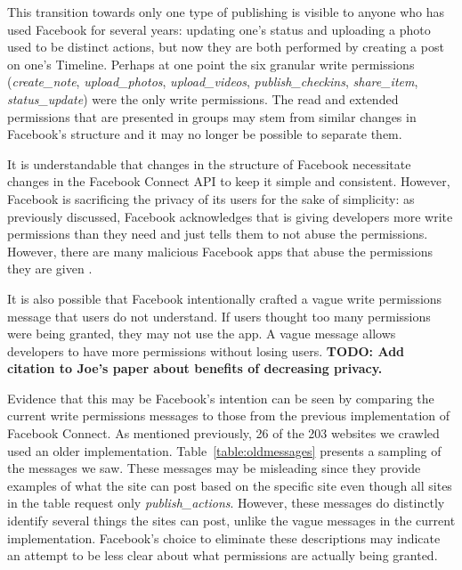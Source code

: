 \documentclass[10pt]{sig-alternate-10pt}
\begin{document}
This transition towards only one type of publishing is visible to anyone who has used Facebook for several years: updating one's status and uploading a photo used to be distinct actions, but now they are both performed by creating a post on one's Timeline. Perhaps at one point the six granular write permissions (\emph{create\_note}, \emph{upload\_photos}, \emph{upload\_videos}, \emph{publish\_checkins}, \emph{share\_item}, \emph{status\_update}) were the only write permissions. The read and extended permissions that are presented in groups may stem from similar changes in Facebook's structure and it may no longer be possible to separate them. %

It is understandable that changes in the structure of Facebook necessitate changes in the Facebook Connect API to keep it simple and consistent. However, Facebook is sacrificing the privacy of its users for the sake of simplicity: as previously discussed, Facebook acknowledges that is giving developers more write permissions than they need and just tells them to not abuse the permissions. However, there are many malicious Facebook apps that abuse the permissions they are given \cite{isappsafe,frappe}.

It is also possible that Facebook intentionally crafted a vague write permissions message that users do not understand. If users thought too many permissions were being granted, they may not use the app. A vague message allows developers to have more permissions without losing users. \textbf{TODO: Add citation to Joe's paper about benefits of decreasing privacy.}

Evidence that this may be Facebook's intention can be seen by comparing the current write permissions messages to those from the previous implementation of Facebook Connect. As mentioned previously, 26 of the 203 websites we crawled used an older implementation. Table~\ref{table:oldmessages} presents a sampling of the messages we saw. These messages may be misleading since they provide examples of what the site can post based on the specific site even though all sites in the table request only \emph{publish\_actions}. However, these messages do distinctly identify several things the sites can post, unlike the vague messages in the current implementation. Facebook's choice to eliminate these descriptions may indicate an attempt to be less clear about what permissions are actually being granted.
\end{document}
